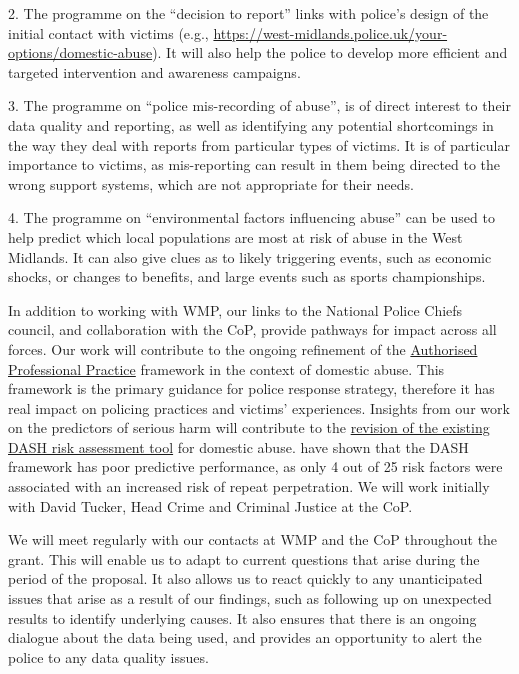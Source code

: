 \documentclass[11pt, a4paper]{article}
\begin{document}
2. The programme on the  ``decision to report'' links with police's design of the initial contact with victims (e.g., \url{https://west-midlands.police.uk/your-options/domestic-abuse}). It will also help the police to develop more efficient and targeted intervention and awareness campaigns.

3. The programme on ``police mis-recording of abuse'', is of direct interest to their data quality and reporting, as well as identifying any potential shortcomings in the way they deal with reports from particular types of victims. It is of particular importance to victims, as mis-reporting can result in them being directed to the wrong support systems, which are not appropriate for their needs.

4. The programme on ``environmental factors influencing abuse'' can be used to help predict which local populations are most at risk of abuse in the West Midlands. It can also give clues as to likely triggering events, such as economic shocks, or changes to benefits, and large events such as sports championships.

In addition to working with WMP, our links to the National Police Chiefs council, and collaboration with the CoP, provide pathways for impact across all forces. Our work will contribute to the ongoing refinement of the \href{https://www.app.college.police.uk/app-content/major-investigation-and-public-protection/domestic-abuse/introduction/)}{Authorised Professional Practice} framework in the context of domestic abuse. This framework is the primary guidance for police response strategy, therefore it has real impact on policing practices and victims' experiences. Insights from our work on the predictors of serious harm will contribute to the \href{https://whatworks.college.police.uk/Research/Documents/DA_risk_assessment_pilot.pdf}{revision of the existing DASH risk assessment tool} for domestic abuse.  have shown that the DASH framework has poor predictive performance, as only 4 out of 25 risk factors were associated with an increased risk of repeat perpetration. We will work initially with David Tucker, Head Crime and Criminal Justice at the CoP.

We will meet regularly with our contacts at WMP and the CoP throughout the grant. This will enable us to adapt to current questions that arise during the period of the proposal. It also allows us to react quickly to any unanticipated issues that arise as a result of our findings, such as following up on unexpected results to identify underlying causes. It also ensures that there is an ongoing dialogue about the data being used, and provides an opportunity to alert the police to any data quality issues.
\end{document}
